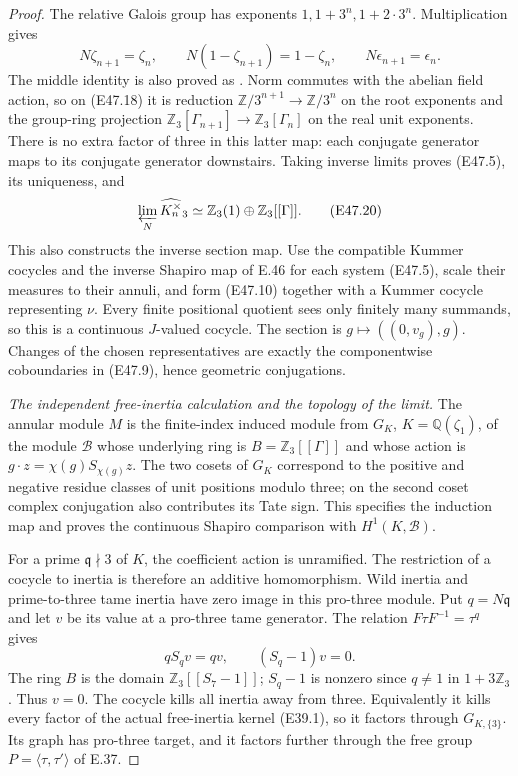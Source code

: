 \begin{proof}
The relative Galois group has exponents
$1,1+3^n,1+2\cdot3^n$. Multiplication gives
\[
 N\zeta_{n+1}=\zeta_n,\qquad
 N(1-\zeta_{n+1})=1-\zeta_n,\qquad
 N\epsilon_{n+1}=\epsilon_n.
 \tag{E47.19}
\]
The middle identity is also proved as
\cite[Lemma 4.3.6]{E_SharifiCyclotomic}.
Norm commutes with the abelian field action,
so on (E47.18) it is reduction
$\mathbb Z/3^{n+1}\to\mathbb Z/3^n$ on the
root exponents and the group-ring projection
$\mathbb Z_3[\Gamma_{n+1}]\to\mathbb Z_3[\Gamma_n]$
on the real unit exponents. There is no extra
factor of three in this latter map: each
conjugate generator maps to its conjugate
generator downstairs. Taking inverse limits
proves (E47.5), its uniqueness, and
\[
       \varprojlim_N\widehat{K_n^\times}_3
            \simeq\mathbb Z_3(1)\oplus\mathbb Z_3[[\Gamma]].
 \tag{E47.20}
\]
This also constructs the inverse section map.
Use the compatible Kummer cocycles and the
inverse Shapiro map of E.46 for each system
(E47.5), scale their measures to their annuli,
and form (E47.10) together with a Kummer
cocycle representing $\nu$. Every finite
positional quotient sees only finitely many
summands, so this is a continuous $J$-valued
cocycle. The section is $g\mapsto((0,v_g),g)$.
Changes of the chosen representatives are
exactly the componentwise coboundaries in
(E47.9), hence geometric conjugations.

\emph{The independent free-inertia calculation and the topology of the limit.}
The annular module $M$ is the finite-index
induced module from $G_K$, $K=\mathbb Q(\zeta_1)$,
of the module $\mathcal B$ whose underlying
ring is $B=\mathbb Z_3[[\Gamma]]$ and whose action is
$g\cdot z=\chi(g)S_{\chi(g)}z$.
The two cosets of $G_K$ correspond to the
positive and negative residue classes of unit
positions modulo three; on the second coset
complex conjugation also contributes its
Tate sign. This specifies the induction map
and proves the continuous Shapiro comparison
with $H^1(K,\mathcal B)$.

For a prime $\mathfrak q\nmid3$ of $K$, the
coefficient action is unramified. The restriction
of a cocycle to inertia is therefore an additive
homomorphism. Wild inertia and prime-to-three
tame inertia have zero image in this pro-three
module. Put $q=N\mathfrak q$ and let $v$ be
its value at a pro-three tame generator.
The relation $F\tau F^{-1}=\tau^q$ gives
\[
        qS_qv=qv,\qquad (S_q-1)v=0.
 \tag{E47.21}
\]
The ring $B$ is the domain $\mathbb Z_3[[S_7-1]]$;
$S_q-1$ is nonzero since $q\ne1$ in
$1+3\mathbb Z_3$. Thus $v=0$. The cocycle
kills all inertia away from three. Equivalently
it kills every factor of the actual free-inertia
kernel (E39.1), so it factors through
$G_{K,\{3\}}$. Its graph has pro-three target,
and it factors further through the free group
$P=\langle\tau,\tau'\rangle$ of E.37.


\end{proof}
